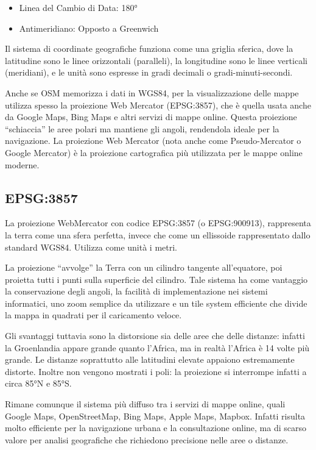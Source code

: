 \begin{itemize}
\item Linea del Cambio di Data: 180°
\item Antimeridiano: Opposto a Greenwich
\end{itemize}

Il sistema di coordinate geografiche funziona come una griglia sferica, dove la latitudine sono le linee orizzontali (paralleli), la longitudine sono le linee verticali (meridiani), e le unità sono espresse in gradi decimali o gradi-minuti-secondi.

Anche se OSM memorizza i dati in WGS84, per la visualizzazione delle mappe utilizza spesso la proiezione Web Mercator (EPSG:3857), che è quella usata anche da Google Maps, Bing Maps e altri servizi di mappe online. Questa proiezione ``schiaccia'' le aree polari ma mantiene gli angoli, rendendola ideale per la navigazione. La proiezione Web Mercator (nota anche come Pseudo-Mercator o Google Mercator) è la proiezione cartografica più utilizzata per le mappe online moderne.

\subsection{EPSG:3857}

La proiezione WebMercator con codice EPSG:3857 (o EPSG:900913), rappresenta la terra come una sfera perfetta, invece che come un ellissoide rappresentato dallo standard WGS84. Utilizza come unità i metri.

La proiezione ``avvolge'' la Terra con un cilindro tangente all'equatore, poi proietta tutti i punti sulla superficie del cilindro. Tale sistema ha come vantaggio la conservazione degli angoli, la facilità di implementazione nei sistemi informatici, uno zoom semplice da utilizzare e un tile system efficiente che divide la mappa in quadrati per il caricamento veloce.

Gli svantaggi tuttavia sono la distorsione sia delle aree che delle distanze: infatti la Groenlandia appare grande quanto l'Africa, ma in realtà l'Africa è 14 volte più grande. Le distanze soprattutto alle latitudini elevate appaiono estremamente distorte. Inoltre non vengono mostrati i poli: la proiezione si interrompe infatti a circa 85°N e 85°S.

Rimane comunque il sistema più diffuso tra i servizi di mappe online, quali Google Maps, OpenStreetMap, Bing Maps, Apple Maps, Mapbox. Infatti risulta molto efficiente per la navigazione urbana e la consultazione online, ma di scarso valore per analisi geografiche che richiedono precisione nelle aree o distanze.

